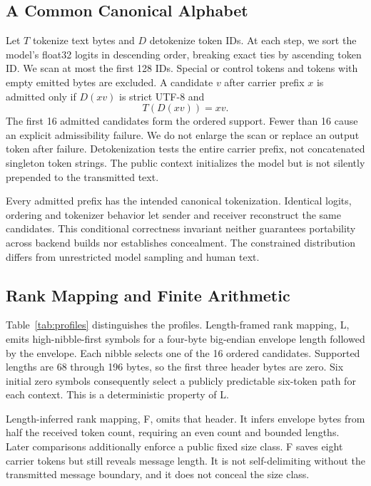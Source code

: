 \documentclass[a4paper,twoside]{article}
\begin{document}
\subsection{A Common Canonical Alphabet}
\noindent Let $T$ tokenize text bytes and $D$ detokenize token IDs. At each step, we sort the model's float32 logits in descending order, breaking exact ties by ascending token ID. We scan at most the first 128 IDs. Special or control tokens and tokens with empty emitted bytes are excluded. A candidate $v$ after carrier prefix $x$ is admitted only if $D(xv)$ is strict UTF-8 and
\begin{equation}
T(D(xv))=xv.
\label{eq:canonical}
\end{equation}
The first 16 admitted candidates form the ordered support. Fewer than 16 cause an explicit admissibility failure. We do not enlarge the scan or replace an output token after failure. Detokenization tests the entire carrier prefix, not concatenated singleton token strings. The public context initializes the model but is not silently prepended to the transmitted text.

Every admitted prefix has the intended canonical tokenization. Identical logits, ordering and tokenizer behavior let sender and receiver reconstruct the same candidates. This conditional correctness invariant neither guarantees portability across backend builds nor establishes concealment. The constrained distribution differs from unrestricted model sampling and human text.



\subsection{Rank Mapping and Finite Arithmetic}
\noindent Table~\ref{tab:profiles} distinguishes the profiles. Length-framed rank mapping, L, emits high-nibble-first symbols for a four-byte big-endian envelope length followed by the envelope. Each nibble selects one of the 16 ordered candidates. Supported lengths are 68 through 196 bytes, so the first three header bytes are zero. Six initial zero symbols consequently select a publicly predictable six-token path for each context. This is a deterministic property of L.

Length-inferred rank mapping, F, omits that header. It infers envelope bytes from half the received token count, requiring an even count and bounded lengths. Later comparisons additionally enforce a public fixed size class. F saves eight carrier tokens but still reveals message length. It is not self-delimiting without the transmitted message boundary, and it does not conceal the size class.
\end{document}
